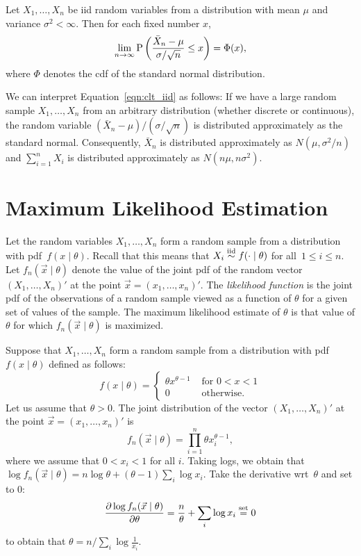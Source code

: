 \begin{theorem}
Let $X_1, \ldots, X_n$ be iid random variables from a distribution with mean $\mu$
and variance $\sigma^2 < \infty$. Then for each fixed number $x$,
\begin{equation} \label{eqn:clt_iid}
\lim_{n \to \infty} \operatorname{P} \left ( \frac{\bar{X}_n - \mu}{\sigma / \sqrt{n} } \leq x \right ) = \Phi (x),
\end{equation} 
where $\Phi$ denotes the cdf of the standard normal distribution.
\end{theorem}
We can interpret Equation~\ref{eqn:clt_iid} as follows: If we have a large 
random sample $X_1, \ldots, X_n$ from an arbitrary distribution (whether 
discrete or continuous), the random variable $(\bar{X}_n - \mu) / (\sigma / \sqrt{n})$ 
is distributed approximately as the standard normal. Consequently, $\bar{X}_n$ 
is distributed approximately as $N(\mu, \sigma^2 / n)$ and $\sum_{i = 1}^n X_i$ 
is distributed approximately as $N(n \mu, n \sigma^2)$.

\section{Maximum Likelihood Estimation}
Let the random variables $X_1, \ldots, X_n$ form a random sample from a 
distribution with pdf~$f(x \mid \theta)$. Recall that this means that 
$X_i \stackrel{\text{iid}}{\sim} f( \cdot \mid \theta)$ for all~$1 \leq i \leq n$. 
Let $f_n(\vec{x} \mid \theta)$ denote the value of the joint pdf of 
the random vector $(X_1, \ldots, X_n)'$ at the point 
$\vec{x} = (x_1, \ldots, x_n)'$. The \emph{likelihood function} is the joint pdf 
of the observations of a random sample viewed as a function of $\theta$ for 
a given set of values of the sample. The maximum likelihood estimate of 
$\theta$ is that value of $\theta$ for which $f_n (\vec{x} \mid \theta)$ is 
maximized. 
\begin{example}
Suppose that $X_1, \ldots, X_n$ form a random sample from a distribution with 
pdf $f(x \mid \theta)$ defined as follows:
\[
    f(x \mid \theta) = 
        \left \{
            \begin{array}{ll}
                \theta x^{\theta - 1} & \text{ for } 0 < x < 1 \\
                0                     & \text{ otherwise}.
            \end{array} 
        \right .
\]
Let us assume that $\theta > 0$. The joint distribution of the vector 
$(X_1, \ldots, X_n)'$ at the point $\vec{x} = (x_1, \ldots, x_n)'$ is 
\[
    f_n (\vec{x} \mid \theta ) = \prod_{i = 1}^n \theta x_i^{\theta - 1},
\]
where we assume that $0 < x_i < 1$ for all $i$. Taking logs, we obtain that
$\log f_n (\vec{x} \mid \theta) = n \log \theta + (\theta - 1) \sum_i \log x_i$. 
Take the derivative wrt~$\theta$ and set to $0$:
\[
    \frac{\partial \log f_n (\vec{x} \mid \theta)}{\partial \theta} = 
        \frac{n}{\theta} + \sum_i \log x_i \stackrel{\text{set}}{=} 0
\]
to obtain that $\theta = n / \sum_i \log \frac{1}{x_i}$.
\end{example}   


